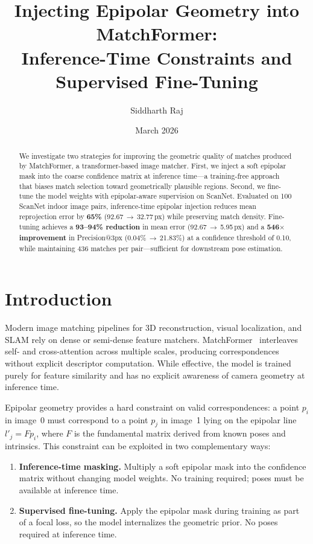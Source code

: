 \documentclass[10pt]{article}
\title{%
    \large\textbf{Injecting Epipolar Geometry into MatchFormer:}\\
    \large\textbf{Inference-Time Constraints and Supervised Fine-Tuning}
}
\author{Siddharth Raj}
\date{March 2026}
\begin{document}
\maketitle

\begin{abstract}
We investigate two strategies for improving the geometric quality of matches produced by MatchFormer, a transformer-based image matcher. First, we inject a soft epipolar mask into the coarse confidence matrix at inference time—a training-free approach that biases match selection toward geometrically plausible regions. Second, we fine-tune the model weights with epipolar-aware supervision on ScanNet. Evaluated on 100 ScanNet indoor image pairs, inference-time epipolar injection reduces mean reprojection error by \textbf{65\%} (92.67\,$\to$\,32.77\,px) while preserving match density. Fine-tuning achieves a \textbf{93--94\% reduction} in mean error (92.67\,$\to$\,5.95\,px) and a \textbf{546$\times$ improvement} in Precision@3px (0.04\%\,$\to$\,21.83\%) at a confidence threshold of 0.10, while maintaining 436 matches per pair—sufficient for downstream pose estimation.
\end{abstract}

\section{Introduction}

Modern image matching pipelines for 3D reconstruction, visual localization, and SLAM rely on dense or semi-dense feature matchers. MatchFormer~\cite{matchformer} interleaves self- and cross-attention across multiple scales, producing correspondences without explicit descriptor computation. While effective, the model is trained purely for feature similarity and has no explicit awareness of camera geometry at inference time.

Epipolar geometry provides a hard constraint on valid correspondences: a point $p_i$ in image~0 must correspond to a point $p_j$ in image~1 lying on the epipolar line $l'_j = F p_i$, where $F$ is the fundamental matrix derived from known poses and intrinsics. This constraint can be exploited in two complementary ways:

\begin{enumerate}[leftmargin=*,itemsep=2pt]
    \item \textbf{Inference-time masking.} Multiply a soft epipolar mask into the confidence matrix without changing model weights. No training required; poses must be available at inference time.
    \item \textbf{Supervised fine-tuning.} Apply the epipolar mask during training as part of a focal loss, so the model internalizes the geometric prior. No poses required at inference time.
\end{enumerate}
\end{document}

